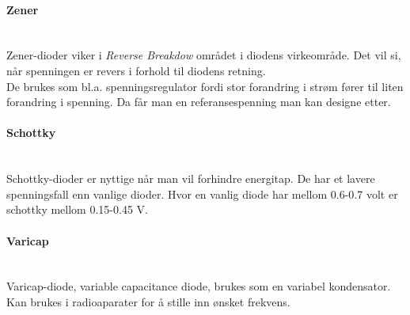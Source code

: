\paragraph{Zener} \mbox{} \\
Zener-dioder viker i \emph{Reverse Breakdow} området i diodens virkeområde.
Det vil si, når spenningen er revers i forhold til diodens retning.
\\
De brukes som bl.a. spenningsregulator fordi
stor forandring i strøm fører til liten forandring i spenning.
Da får man en referansespenning man kan designe etter.

\paragraph{Schottky} \mbox{} \\
Schottky-dioder er nyttige når man vil forhindre energitap.
De har et lavere spenningsfall enn vanlige dioder.
Hvor en vanlig diode har mellom 0.6-0.7 volt er schottky mellom 0.15-0.45 V.

\paragraph{Varicap} \mbox{} \\
Varicap-diode, variable capacitance diode,
brukes som en variabel kondensator.
Kan brukes i radioaparater for å stille inn ønsket frekvens.
